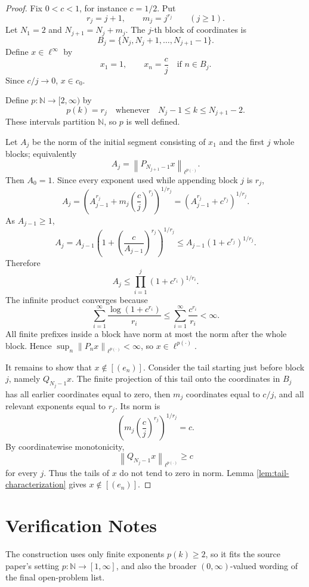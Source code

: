 \documentclass[11pt]{amsart}
\newcommand{\N}{\mathbb N}
\newcommand{\norm}[1]{\left\|#1\right\|}
\begin{document}
\begin{proof}
Fix \(0<c<1\), for instance \(c=1/2\).  Put
\[
  r_j=j+1,\qquad m_j=j^{r_j}\qquad (j\ge1).
\]
Let \(N_1=2\) and \(N_{j+1}=N_j+m_j\).  The \(j\)-th block of coordinates is
\[
  B_j=\{N_j,N_j+1,\ldots,N_{j+1}-1\}.
\]
Define \(x\in\ell^\infty\) by
\[
  x_1=1,\qquad x_n=\frac{c}{j}\quad\text{if }n\in B_j.
\]
Since \(c/j\to0\), \(x\in c_0\).

Define \(p:\N\to[2,\infty)\) by
\[
  p(k)=r_j\quad\text{whenever}\quad N_j-1\le k\le N_{j+1}-2.
\]
These intervals partition \(\N\), so \(p\) is well defined.

Let \(A_j\) be the norm of the initial segment consisting of \(x_1\) and the
first \(j\) whole blocks; equivalently
\[
  A_j=\norm{P_{N_{j+1}-1}x}_{\ell^{p(\cdot)}}.
\]
Then \(A_0=1\).  Since every exponent used while appending block \(j\) is
\(r_j\),
\[
  A_j
  =\left(A_{j-1}^{r_j}+m_j\left(\frac cj\right)^{r_j}\right)^{1/r_j}
  =\left(A_{j-1}^{r_j}+c^{r_j}\right)^{1/r_j}.
\]
As \(A_{j-1}\ge1\),
\[
  A_j
  =A_{j-1}\left(1+\left(\frac{c}{A_{j-1}}\right)^{r_j}\right)^{1/r_j}
  \le A_{j-1}(1+c^{r_j})^{1/r_j}.
\]
Therefore
\[
  A_j\le \prod_{i=1}^j(1+c^{r_i})^{1/r_i}.
\]
The infinite product converges because
\[
  \sum_{i=1}^\infty \frac{\log(1+c^{r_i})}{r_i}
  \le \sum_{i=1}^\infty \frac{c^{r_i}}{r_i}<\infty.
\]
All finite prefixes inside a block have norm at most the norm after the whole
block.  Hence \(\sup_n\norm{P_nx}_{\ell^{p(\cdot)}}<\infty\), so
\(x\in\ell^{p(\cdot)}\).

It remains to show that \(x\notin[(e_n)]\).  Consider the tail starting just
before block \(j\), namely \(Q_{N_j-1}x\).  The finite projection of this tail
onto the coordinates in \(B_j\) has all earlier coordinates equal to zero,
then \(m_j\) coordinates equal to \(c/j\), and all relevant exponents equal
to \(r_j\).  Its norm is
\[
  \left(m_j\left(\frac cj\right)^{r_j}\right)^{1/r_j}=c.
\]
By coordinatewise monotonicity,
\[
  \norm{Q_{N_j-1}x}_{\ell^{p(\cdot)}}\ge c
\]
for every \(j\).  Thus the tails of \(x\) do not tend to zero in norm.
Lemma \ref{lem:tail-characterization} gives \(x\notin[(e_n)]\).
\end{proof}

\section*{Verification Notes}

The construction uses only finite exponents \(p(k)\ge2\), so it fits the
source paper's setting \(p:\N\to[1,\infty]\), and also the broader
\((0,\infty)\)-valued wording of the final open-problem list.
\end{document}
